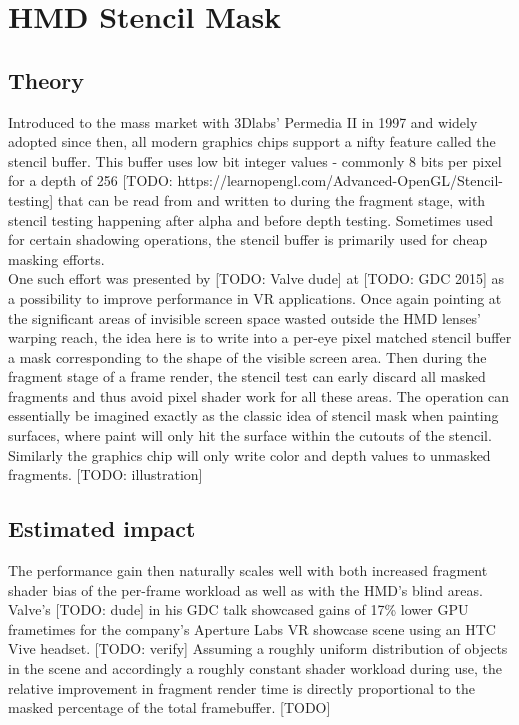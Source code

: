 
\section{HMD Stencil Mask} \label{stencilmask}
\subsection{Theory}
Introduced to the mass market with 3Dlabs' Permedia II in 1997 and widely adopted since then, all modern graphics chips support a nifty feature called the stencil buffer. This buffer uses low bit integer values - commonly 8 bits per pixel for a depth of 256 [TODO: https://learnopengl.com/Advanced-OpenGL/Stencil-testing] that can be read from and written to during the fragment stage, with stencil testing happening after alpha and before depth testing. Sometimes used for certain shadowing operations, the stencil buffer is primarily used for cheap masking efforts. \\
One such effort was presented by [TODO: Valve dude] at [TODO: GDC 2015] as a possibility to improve performance in VR applications. Once again pointing at the significant areas of invisible screen space wasted outside the HMD lenses' warping reach, the idea here is to write into a per-eye pixel matched stencil buffer a mask corresponding to the shape of the visible screen area. Then during the fragment stage of a frame render, the stencil test can early discard all masked fragments and thus avoid pixel shader work for all these areas. The operation can essentially be imagined exactly as the classic idea of stencil mask when painting surfaces, where paint will only hit the surface within the cutouts of the stencil. Similarly the graphics chip will only write color and depth values to unmasked fragments. 
[TODO: illustration]

\subsection{Estimated impact}
The performance gain then naturally scales well with both increased fragment shader bias of the per-frame workload as well as with the HMD's blind areas. Valve's [TODO: dude] in his GDC talk showcased gains of 17\% lower GPU frametimes for the company's Aperture Labs VR showcase scene using an HTC Vive headset. [TODO: verify]
Assuming a roughly uniform distribution of objects in the scene and accordingly a roughly constant shader workload during use, the relative improvement in fragment render time is directly proportional to the masked percentage of the total framebuffer. 
[TODO]

